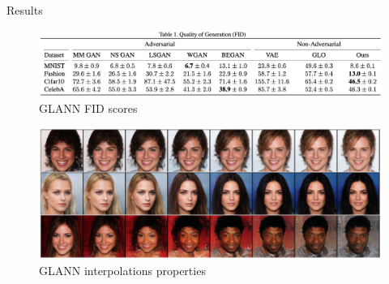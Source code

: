 \documentclass[10pt]{beamer}
\begin{document}
\begin{frame}{Results}
    \begin{figure}
        \centering
        \includegraphics[width=\textwidth]{images/glann-results}
        \caption{GLANN FID scores}
    \end{figure}
    
    \begin{figure}
        \centering
        \includegraphics[width=\textwidth]{images/glann-interpolations}
        \caption{GLANN interpolations properties}
    \end{figure}
\end{frame}
\end{document}
